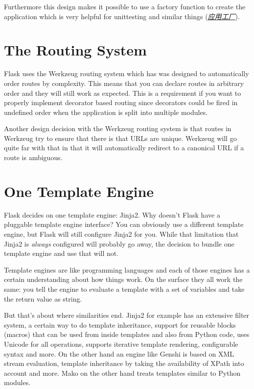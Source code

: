 \documentclass[a4paper,12pt]{sphinxmanual}
\begin{document}
Furthermore this design makes it possible to use a factory function to
create the application which is very helpful for unittesting and similar
things ({\hyperref[patterns/appfactories:app-factories]{\emph{应用工厂}}}).


\section{The Routing System}
\label{design:the-routing-system}
Flask uses the Werkzeug routing system which has was designed to
automatically order routes by complexity.  This means that you can declare
routes in arbitrary order and they will still work as expected.  This is a
requirement if you want to properly implement decorator based routing
since decorators could be fired in undefined order when the application is
split into multiple modules.

Another design decision with the Werkzeug routing system is that routes
in Werkzeug try to ensure that there is that URLs are unique.  Werkzeug
will go quite far with that in that it will automatically redirect to a
canonical URL if a route is ambiguous.


\section{One Template Engine}
\label{design:one-template-engine}
Flask decides on one template engine: Jinja2.  Why doesn't Flask have a
pluggable template engine interface?  You can obviously use a different
template engine, but Flask will still configure Jinja2 for you.  While
that limitation that Jinja2 is \emph{always} configured will probably go away,
the decision to bundle one template engine and use that will not.

Template engines are like programming languages and each of those engines
has a certain understanding about how things work.  On the surface they
all work the same: you tell the engine to evaluate a template with a set
of variables and take the return value as string.

But that's about where similarities end.  Jinja2 for example has an
extensive filter system, a certain way to do template inheritance, support
for reusable blocks (macros) that can be used from inside templates and
also from Python code, uses Unicode for all operations, supports
iterative template rendering, configurable syntax and more.  On the other
hand an engine like Genshi is based on XML stream evaluation, template
inheritance by taking the availability of XPath into account and more.
Mako on the other hand treats templates similar to Python modules.
\end{document}
